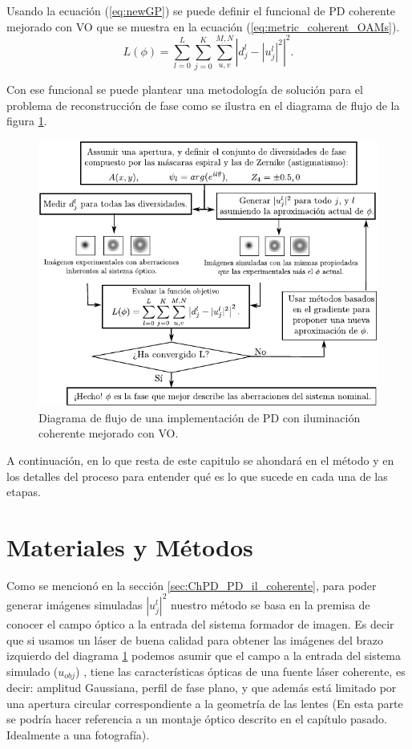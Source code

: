 Usando la ecuación (\ref{eq:newGP}) se puede definir el funcional de
PD coherente mejorado con VO que se muestra en la ecuación
(\ref{eq:metric_coherent_OAMs}). %
\begin{equation}\label{eq:metric_coherent_OAMs}
L(\phi)= \sum_{l=0}^L\sum_{j=0}^{K} \sum_{u,v}^{M,N}  \left |d_{j}^l - |u_j^l|^2 \right | ^2.
\end{equation}

Con ese funcional se puede plantear una metodología de solución para
el problema de reconstrucción de fase como se ilustra en el diagrama
de flujo de la figura  \ref{fig:flowchart}.

\begin{figure}[h!]
\centering
\includegraphics[scale=1.2]{PDLightFlux_simple_esp.pdf}
\caption[Diagrama de flujo del PD con iluminación coherente]{Diagrama de flujo de una implementación de PD con iluminación
  coherente mejorado con VO.}
\label{fig:flowchart}
\end{figure}

A continuación, en lo que resta de este capitulo se ahondará en el método y en los detalles del proceso
para entender qué es lo que sucede en cada una de las etapas. 

\section{Materiales y Métodos}
\label{sec:ChPD_materiales_y_metodos}

Como se mencionó en la sección \ref{sec:ChPD_PD_il_coherente}, para
poder generar imágenes simuladas $|u_j^l|^2$ nuestro método se basa en
la premisa de conocer el campo óptico a la entrada del sistema
formador de imagen. Es decir que si usamos un láser de buena calidad
para obtener las imágenes del brazo izquierdo del diagrama
\ref{fig:flowchart} podemos asumir que el campo a la entrada del
sistema simulado ($u_{obj}$)
, tiene las características
ópticas de una fuente láser coherente, es decir: amplitud Gaussiana, perfil
de fase plano, y que además está limitado por una
apertura circular correspondiente a la geometría de las lentes (En esta parte se podría hacer referencia a
un montaje óptico descrito en el capítulo pasado. Idealmente a una fotografía).  

